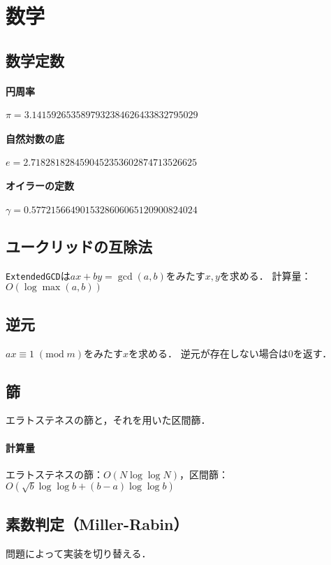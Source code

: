 \documentclass[landscape,twocolumn,9pt]{jsarticle}
\begin{document}
\section{数学}%
\subsection{数学定数}
\paragraph{円周率} \hspace{12.16mm}
$ \pi=   3.1415926535897932384626433832795029 $
\paragraph{自然対数の底} \hspace{2.66mm}
$ e=     2.7182818284590452353602874713526625 $
\paragraph{オイラーの定数}
$ \gamma=0.5772156649015328606065120900824024 $

\subsection{ユークリッドの互除法}
\texttt{ExtendedGCD}は$ax+by=\gcd(a,b)$をみたす$x,y$を求める．
計算量：$O(\log\max(a,b))$


\subsection{逆元}
$ax\equiv 1\; (\mathrm{mod}\; m)$をみたす$x$を求める．
逆元が存在しない場合は0を返す．


\subsection{篩}
エラトステネスの篩と，それを用いた区間篩．
\paragraph{計算量} エラトステネスの篩：$O(N\log\log N)$，区間篩：$O(\sqrt b \log\log b+(b-a)\log\log b)$


\subsection{素数判定（Miller-Rabin）}
問題によって実装を切り替える．

\end{document}
